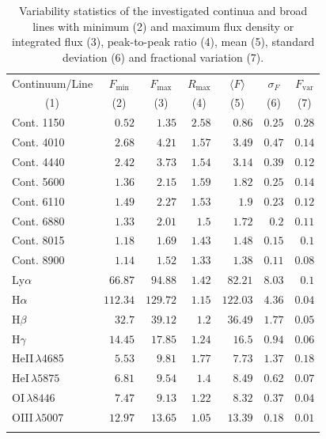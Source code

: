 \begin{table}[!htb] 
	\centering 
	\caption{Variability statistics of the investigated continua and broad lines with minimum (2) and maximum flux density or integrated flux (3), peak-to-peak ratio (4), mean (5), standard deviation (6) and fractional variation (7).} 
	\begin{tabular}{lrrrrrr} 
		\hline 
		\hline 
		Continuum/Line &  \multicolumn{1}{c}{$F_{\text{min}}$} &  \multicolumn{1}{c}{$F_{\text{max}}$} &  \multicolumn{1}{c}{$R_{\text{max}}$} &  \multicolumn{1}{c}{$\langle F \rangle$} &  \multicolumn{1}{c}{$\sigma_F$} &  \multicolumn{1}{c}{$F_{\text{var}}$} \\ 
		\multicolumn{1}{c}{(1)} & \multicolumn{1}{c}{(2)} & \multicolumn{1}{c}{(3)} & \multicolumn{1}{c}{(4)} & \multicolumn{1}{c}{(5)} & \multicolumn{1}{c}{(6)} & \multicolumn{1}{c}{(7)} \\ 
		\hline 
		Cont. 1150  & $0.52$ & $1.35$ & $2.58$ & $0.86$ & $0.25$ & $0.28$ \\
		Cont. 4010  & $2.68$ & $4.21$ & $1.57$ & $3.49$ & $0.47$ & $0.14$ \\
		Cont. 4440  & $2.42$ & $3.73$ & $1.54$ & $3.14$ & $0.39$ & $0.12$ \\
		Cont. 5600  & $1.36$ & $2.15$ & $1.59$ & $1.82$ & $0.25$ & $0.14$ \\
		Cont. 6110  & $1.49$ & $2.27$ & $1.53$ & $1.9$ & $0.23$ & $0.12$ \\
		Cont. 6880  & $1.33$ & $2.01$ & $1.5$ & $1.72$ & $0.2$ & $0.11$ \\
		Cont. 8015  & $1.18$ & $1.69$ & $1.43$ & $1.48$ & $0.15$ & $0.1$ \\
		Cont. 8900  & $1.14$ & $1.52$ & $1.33$ & $1.38$ & $0.11$ & $0.08$ \\
		\hline 
		Ly$\alpha$  & $66.87$ & $94.88$ & $1.42$ & $82.21$ & $8.03$ & $0.1$ \\
		H$\alpha$  & $112.34$ & $129.72$ & $1.15$ & $122.03$ & $4.36$ & $0.04$ \\
		H$\beta$  & $32.7$ & $39.12$ & $1.2$ & $36.49$ & $1.77$ & $0.05$ \\
		H$\gamma$  & $14.45$ & $17.85$ & $1.24$ & $16.5$ & $0.94$ & $0.06$ \\
		HeII$\,\lambda$4685  & $5.53$ & $9.81$ & $1.77$ & $7.73$ & $1.37$ & $0.18$ \\
		HeI$\,\lambda5875$  & $6.81$ & $9.54$ & $1.4$ & $8.49$ & $0.62$ & $0.07$ \\
		OI$\,\lambda 8446$ & $7.47$ & $9.13$ & $1.22$ & $8.32$ & $0.37$ & $0.04$ \\
		\hline
		OIII$\,\lambda 5007$  & $12.97$ & $13.65$ & $1.05$ & $13.39$ & $0.18$ & $0.01$ \\
		\hline 
		\hline 
		\label{tab:varstatistics} 
	\end{tabular} 
	
\end{table}



